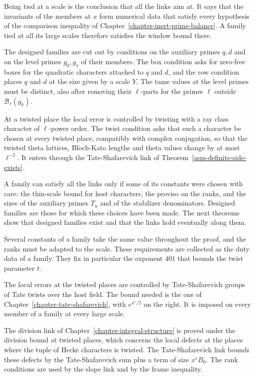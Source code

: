 Being tied at a scale is the conclusion that all the links aim at. It says
that the invariants of the members at $x$ form numerical data that satisfy
every hypothesis of the comparison inequality of
Chapter~\ref{chapter-inert-prime-balance}. A family tied at all its large
scales therefore satisfies the window bound there.

The designed families are cut out by conditions on the auxiliary primes $q,d$
and on the level primes $g_0,g_1$ of their members. The box condition asks
for zero-free boxes for the quadratic characters attached to $q$ and $d$, and
the row condition places $q$ and $d$ at the size given by a scale $Y$. The
tame values at the level primes must be distinct, also after removing their
$\ell$-parts for the primes $\ell$ outside $\mathcal B_r(g_k)$.

At a twisted place the local error is controlled by twisting with a ray class
character of $\ell$-power order. The twist condition asks that such a
character be chosen at every twisted place, compatibly with complex
conjugation, so that the twisted theta lattices, Bloch-Kato lengths and theta
values change by at most $\ell^{-2}$. It enters through the Tate-Shafarevich
link of Theorem~\ref{asm-definite-side-exists}.

A family can satisfy all the links only if some of its constants were chosen
with care: the thin-scale bound for host characters, the proviso on the
ranks, and the sizes of the auxiliary primes $T_u$ and of the stabilizer
denominators. Designed families are those for which these choices have been
made. The next theorems show that designed families exist and that the links
hold eventually along them.

Several constants of a family take the same value throughout the proof, and
the ranks must be adapted to the scale. These requirements are collected as
the duty data of a family. They fix in particular the exponent $401$ that
bounds the twist parameter $t$.

The local errors at the twisted places are controlled by Tate-Shafarevich
groups of Tate twists over the host field. The bound needed is the one of
Chapter~\ref{chapter-tate-shafarevich}, with $e^{x^{\varepsilon}/2}$ on the
right. It is imposed on every member of a family at every large scale.

The division link of Chapter~\ref{chapter-integral-structure} is proved under
the division bound at twisted places, which concerns the local defects at the
places where the tuple of Hecke characters is twisted. The Tate-Shafarevich
link bounds these defects by the Tate-Shafarevich sum plus a term of size
$x^{\varepsilon}B_0$. The rank conditions are used by the slope link and by
the frame inequality.

